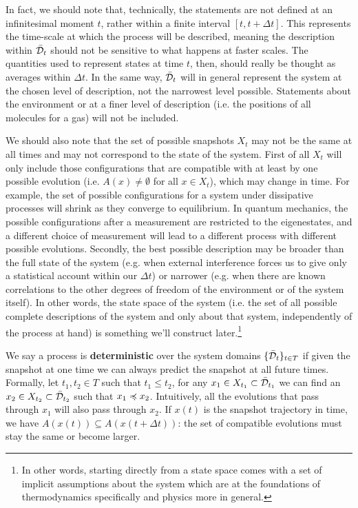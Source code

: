 \documentclass[letterpaper]{article}
\begin{document}
In fact, we should note that, technically, the statements are not defined at an infinitesimal moment $t$, rather within a finite interval $[t, t + \Delta t]$. This represents the time-scale at which the process will be described, meaning the description within $\bar{\mathcal{D}}_t$ should not be sensitive to what happens at faster scales. The quantities used to represent states at time $t$, then, should really be thought as averages within $\Delta t$. In the same way, $\bar{\mathcal{D}}_t$ will in general represent the system at the chosen level of description, not the narrowest level possible. Statements about the environment or at a finer level of description (i.e. the positions of all molecules for a gas) will not be included.

We should also note that the set of possible snapshots $X_t$ may not be the same at all times and may not correspond to the state of the system. First of all $X_t$ will only include those configurations that are compatible with at least by one possible evolution (i.e. $A(x) \neq \emptyset$ for all $x \in X_t$), which may change in time. For example, the set of possible configurations for a system under dissipative processes will shrink as they converge to equilibrium. In quantum mechanics, the possible configurations after a measurement are restricted to the eigenestates, and a different choice of measurement will lead to a different process with different possible evolutions. Secondly, the best possible description may be broader than the full state of the system (e.g. when external interference forces us to give only a statistical account within our $\Delta t$) or narrower (e.g. when there are known correlations to the other degrees of freedom of the environment or of the system itself). In other words, the state space of the system (i.e. the set of all possible complete descriptions of the system and only about that system, independently of the process at hand) is something we'll construct later.\footnote{In other words, starting directly from a state space comes with a set of implicit assumptions about the system which are at the foundations of thermodynamics specifically and physics more in general.}

We say a process is \textbf{deterministic} over the system domains $\{\bar{\mathcal{D}}_t\}_{t \in T}$ if given the snapshot at one time we can always predict the snapshot at all future times. Formally, let $t_1, t_2 \in T$ such that $t_1 \leq t_2$, for any $x_1 \in X_{t_1} \subset \bar{\mathcal{D}}_{t_1}$ we can find an $x_2 \in X_{t_2} \subset \bar{\mathcal{D}}_{t_2}$ such that $x_1 \preccurlyeq x_2$. Intuitively, all the evolutions that pass through $x_1$ will also pass through $x_2$. If $x(t)$ is the snapshot trajectory in time, we have $A(x(t)) \subseteq A(x(t + \Delta t))$: the set of compatible evolutions must stay the same or become larger.
\end{document}
